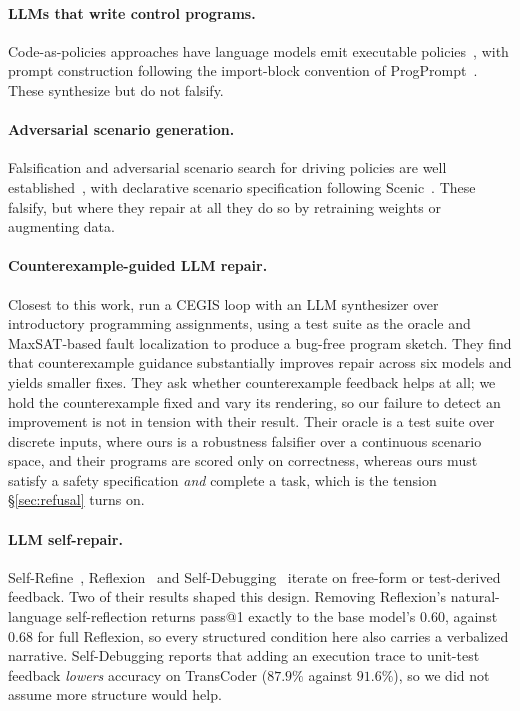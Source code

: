 \documentclass{article}
\begin{document}
\paragraph{LLMs that write control programs.}
Code-as-policies approaches have language models emit executable
policies~\citep{liang2023codeaspolicies}, with prompt construction following the
import-block convention of ProgPrompt~\citep{singh2023progprompt}. These
synthesize but do not falsify.

\paragraph{Adversarial scenario generation.}
Falsification and adversarial scenario search for driving policies are well
established~\citep{wang2021advsim}, with declarative scenario specification
following Scenic~\citep{fremont2019scenic}. These falsify, but where they repair
at all they do so by retraining weights or augmenting data.

\paragraph{Counterexample-guided LLM repair.}
Closest to this work, \citet{orvalho2025cegis} run a CEGIS loop with an LLM
synthesizer over introductory programming assignments, using a test suite as the
oracle and MaxSAT-based fault localization to produce a bug-free program sketch.
They find that counterexample guidance substantially improves repair across six
models and yields smaller fixes. They ask whether counterexample feedback helps at
all; we hold the counterexample fixed and vary its rendering, so our failure to
detect an improvement is not in tension with their result. Their oracle is a test
suite over discrete inputs, where ours is a robustness falsifier over a
continuous scenario space, and their programs are scored only on correctness,
whereas ours must satisfy a safety specification \emph{and} complete a task,
which is the tension \S\ref{sec:refusal} turns on.

\paragraph{LLM self-repair.}
Self-Refine~\citep{madaan2023selfrefine}, Reflexion~\citep{shinn2023reflexion}
and Self-Debugging~\citep{chen2024selfdebug} iterate on free-form or test-derived
feedback. Two of their results shaped this design. Removing Reflexion's
natural-language self-reflection returns pass@1 exactly to the base model's
$0.60$, against $0.68$ for full Reflexion, so every structured condition here also
carries a verbalized narrative. Self-Debugging reports that adding an execution
trace to unit-test feedback \emph{lowers} accuracy on TransCoder ($87.9\%$ against
$91.6\%$), so we did not assume more structure would help.
\end{document}
